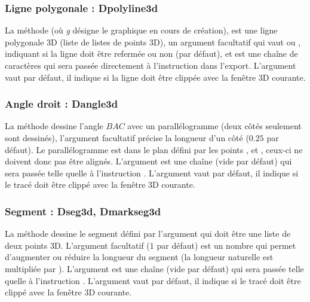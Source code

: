 \subsubsection{Ligne polygonale : Dpolyline3d}

La méthode  (où \emph{g} désigne le graphique en cours de création),  est une ligne polygonale 3D (liste de listes de points 3D),  un argument facultatif qui vaut \true ou \false, indiquant si la ligne doit être refermée ou non (\false par défaut), et  est une chaîne de caractères qui sera passée directement à l'instruction \drawcmd dans l'export. L'argument  vaut \false par défaut, il indique si la ligne  doit être clippée avec la fenêtre 3D courante.
    
\subsubsection{Angle droit : Dangle3d}

La méthode  dessine l'angle \(BAC\) avec un parallélogramme (deux côtés seulement sont dessinés), l'argument facultatif  précise la longueur d'un côté ($0.25$ par défaut). Le parallélogramme est dans le plan défini par les points ,  et , ceux-ci ne doivent donc pas être alignés. L'argument  est une chaîne (vide par défaut) qui sera passée telle quelle à l'instruction  \drawcmd . L'argument  vaut \false par défaut, il indique si le tracé doit être clippé avec la fenêtre 3D courante.
    
\subsubsection{Segment : Dseg3d, Dmarkseg3d}

La méthode  dessine le segment défini par l'argument  qui doit être une liste de deux points 3D. L'argument facultatif  ($1$ par défaut) est un nombre qui permet d'augmenter ou réduire la longueur du segment (la longueur naturelle est multipliée par ). L'argument  est une chaîne (vide par défaut) qui sera passée telle quelle à l'instruction \drawcmd . L'argument  vaut \false par défaut, il indique si le tracé doit être clippé avec la fenêtre 3D courante.

